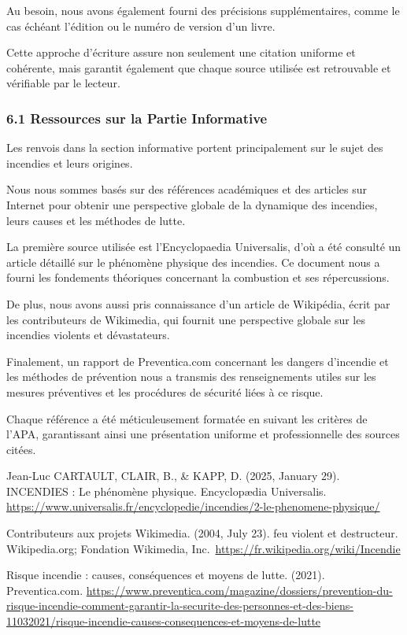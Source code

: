 \documentclass[
]{article}
\begin{document}
Au besoin, nous avons également fourni des précisions supplémentaires,
comme le cas échéant l'édition ou le numéro de version d'un livre.

Cette approche d'écriture assure non seulement une citation uniforme et
cohérente, mais garantit également que chaque source utilisée est
retrouvable et vérifiable par le lecteur.

\subsubsection{6.1 Ressources sur la Partie
Informative}\label{ressources-sur-la-partie-informative}

Les renvois dans la section informative portent principalement sur le
sujet des incendies et leurs origines.

Nous nous sommes basés sur des références académiques et des articles
sur Internet pour obtenir une perspective globale de la dynamique des
incendies, leurs causes et les méthodes de lutte.

La première source utilisée est l'Encyclopaedia Universalis, d'où a été
consulté un article détaillé sur le phénomène physique des incendies. Ce
document nous a fourni les fondements théoriques concernant la
combustion et ses répercussions.

De plus, nous avons aussi pris connaissance d'un article de Wikipédia,
écrit par les contributeurs de Wikimedia, qui fournit une perspective
globale sur les incendies violents et dévastateurs.

Finalement, un rapport de Preventica.com concernant les dangers
d'incendie et les méthodes de prévention nous a transmis des
renseignements utiles sur les mesures préventives et les procédures de
sécurité liées à ce risque.

Chaque référence a été méticuleusement formatée en suivant les critères
de l'APA, garantissant ainsi une présentation uniforme et
professionnelle des sources citées.

Jean-Luc CARTAULT, CLAIR, B., \& KAPP, D. (2025, January 29). INCENDIES
: Le phénomène physique. Encyclopædia Universalis.
\url{https://www.universalis.fr/encyclopedie/incendies/2-le-phenomene-physique/}

Contributeurs aux projets Wikimedia. (2004, July 23). feu violent et
destructeur. Wikipedia.org; Fondation Wikimedia,
Inc.~\url{https://fr.wikipedia.org/wiki/Incendie}

Risque incendie : causes, conséquences et moyens de lutte. (2021).
Preventica.com.
\url{https://www.preventica.com/magazine/dossiers/prevention-du-risque-incendie-comment-garantir-la-securite-des-personnes-et-des-biens-11032021/risque-incendie-causes-consequences-et-moyens-de-lutte}
\end{document}
